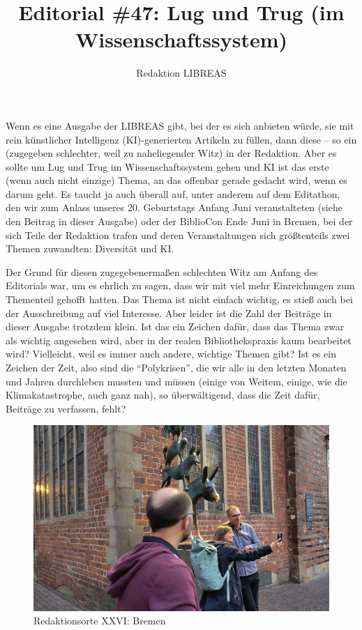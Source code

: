 \documentclass[a4paper,
fontsize=11pt,
oneside,
numbers=noperiodatend,
parskip=half-,
bibliography=totoc,
final
]{scrartcl}
\title{\LARGE{Editorial \#47: Lug und Trug (im Wissenschaftssystem)}}%
\author{Redaktion LIBREAS} %
\date{}
\begin{document}
\maketitle
\thispagestyle{fancyplain} 


Wenn es eine Ausgabe der LIBREAS gibt, bei der es sich anbieten würde,
sie mit rein künstlicher Intelligenz (KI)-generierten Artikeln zu
füllen, dann diese -- so ein (zugegeben schlechter, weil zu
naheliegender Witz) in der Redaktion. Aber es sollte um Lug und Trug im
Wissenschaftssystem gehen und KI ist das erste (wenn auch nicht einzige)
Thema, an das offenbar gerade gedacht wird, wenn es darum geht. Es
taucht ja auch überall auf, unter anderem auf dem Editathon, den wir zum
Anlass unseres 20. Geburtstags Anfang Juni veranstalteten (siehe den
Beitrag in dieser Ausgabe) oder der BiblioCon Ende Juni in Bremen, bei
der sich Teile der Redaktion trafen und deren Veranstaltungen sich
größtenteils zwei Themen zuwandten: Diversität und KI.

Der Grund für diesen zugegebenermaßen schlechten Witz am Anfang des
Editorials war, um es ehrlich zu sagen, dass wir mit viel mehr
Einreichungen zum Thementeil gehofft hatten. Das Thema ist nicht einfach
wichtig, es stieß auch bei der Ausschreibung auf viel Interesse. Aber
leider ist die Zahl der Beiträge in dieser Ausgabe trotzdem klein. Ist
das ein Zeichen dafür, dass das Thema zwar als wichtig angesehen wird,
aber in der realen Bibliothekspraxis kaum bearbeitet wird? Vielleicht,
weil es immer auch andere, wichtige Themen gibt? Ist es ein Zeichen der
Zeit, also sind die \enquote{Polykrisen}, die wir alle in den letzten
Monaten und Jahren durchleben mussten und müssen (einige von Weitem,
einige, wie die Klimakatastrophe, auch ganz nah), so überwältigend, dass
die Zeit dafür, Beiträge zu verfassen, fehlt?

\begin{figure}[H]
\centering
\includegraphics[width=.7\textwidth]{img/Bremen_Redaktionsorte.jpg}
\caption{Redaktionsorte XXVI: Bremen}
\end{figure}
\end{document}
